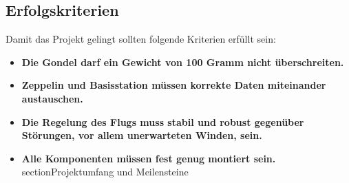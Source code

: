 \documentclass[lang=ngerman,inputenc=utf8,fontsize=10pt]{ldvarticle}
\begin{document}
\subsection*{Erfolgskriterien}
Damit das Projekt gelingt sollten folgende Kriterien erfüllt sein:
\begin{itemize}
	\item \textbf{Die Gondel darf ein Gewicht von 100 Gramm nicht überschreiten.}
	\item \textbf{Zeppelin und Basisstation müssen korrekte Daten miteinander austauschen.}
	\item \textbf{Die Regelung des Flugs muss stabil und robust gegenüber Störungen, vor allem unerwarteten Winden, sein.}
	\item \textbf{Alle Komponenten müssen fest genug montiert sein.}
section{Projektumfang und Meilensteine}




\end{itemize}
\end{document}
